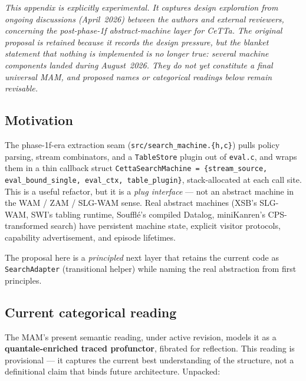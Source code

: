 \documentclass[11pt]{article}
\newcommand{\code}[1]{\texttt{#1}}
\newcommand{\CeTTa}{\textup{CeTTa}}
\begin{document}
\emph{This appendix is explicitly experimental.  It captures design
exploration from ongoing discussions (April~2026) between the authors
and external reviewers, concerning the
post-phase-1f abstract-machine layer for \CeTTa{}.  The original proposal is
retained because it records the design pressure, but the blanket statement
that nothing is implemented is no longer true: several machine components
landed during August~2026.  They do not yet constitute a final universal MAM,
and proposed names or categorical readings below remain revisable.}

\subsection{Motivation}

The phase-1f-era extraction seam (\code{src/search\_machine.\{h,c\}})
pulls policy parsing, stream combinators, and a \code{TableStore}
plugin out of \code{eval.c}, and wraps them in a thin callback struct
\code{CettaSearchMachine = \{stream\_source, eval\_bound\_single,
  eval\_ctx, table\_plugin\}}, stack-allocated at each call site.
This is a useful refactor, but it is a \emph{plug interface} — not an
abstract machine in the WAM / ZAM / SLG-WAM sense.  Real abstract
machines (XSB's SLG-WAM, SWI's tabling runtime, Soufflé's compiled
Datalog, miniKanren's CPS-transformed search) have persistent machine
state, explicit visitor protocols, capability advertisement, and
episode lifetimes.

The proposal here is a \emph{principled} next layer that retains the
current code as \code{SearchAdapter} (transitional helper) while
naming the real abstraction from first principles.

\subsection{Current categorical reading}

The MAM's present semantic reading, under active revision, models it
as a \textbf{quantale-enriched traced profunctor}, fibrated for
reflection.  This reading is provisional --- it captures the current
best understanding of the structure, not a definitional claim that
binds future architecture.  Unpacked:
\end{document}
